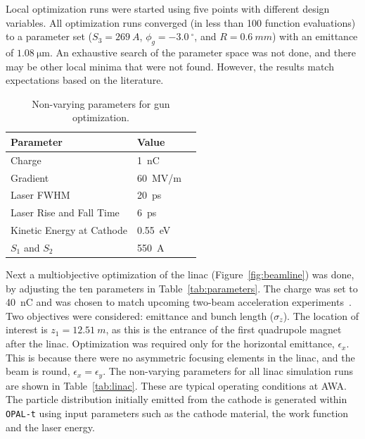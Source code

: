 Local optimization runs were started using five points 
with different design variables. All optimization runs converged 
(in less than 100 function evaluations) to a parameter set ($S_3=\SI{269}{A}$,
$\phi_g=\SI{-3.0}{^{\circ}}$, and $R=\SI{0.6}{mm}$) with an emittance of $\SI{1.08}{\um}$.
An exhaustive search of the parameter space was not done, and there may be other local minima that were not found.
However, the results match expectations based on the literature. 
\begin{table}%
	\caption{\label{tab:gun} Non-varying parameters for gun optimization.}
	\begin{center}
		\begin{tabular}{lll}
			\toprule
			\toprule
			\textbf{Parameter} & \textbf{Value} \\
			\midrule
			Charge  & \SI{1}{nC} \\
			Gradient & \SI{60}{MV/m} \\
			Laser FWHM & \SI{20}{ps} \\
			Laser Rise and Fall Time & \SI{6}{ps} \\
			Kinetic Energy at Cathode  & \SI{0.55}{eV} \\
			$S_1$ and $S_2$ & \SI{550}{A} \\
			\bottomrule
		\end{tabular}
	\end{center}
\end{table}

\label{sec:linacopt}
Next a multiobjective optimization of the linac (Figure~\ref{fig:beamline}) was done, 
by adjusting the ten parameters in Table~\ref{tab:parameters}. The charge was set to \SI{40}{nC}
and was chosen to match upcoming two-beam acceleration experiments~\cite{tba2017}. 
Two objectives were considered: emittance and bunch length ($\sigma_z$). 
The location of interest is $z_1=\SI{12.51}{m}$, as this is the entrance of the first 
quadrupole magnet after the linac. Optimization was required only for the horizontal emittance, $\epsilon_{x}$.  
This is because there were no asymmetric focusing elements in the linac, and the beam is round, $\epsilon_{x}=\epsilon_{y}$. 
The non-varying parameters for all linac simulation runs are shown in Table~\ref{tab:linac}. 
These are typical operating conditions at AWA. 
The particle distribution initially emitted from the cathode is generated within \verb|OPAL-t| 
using input parameters such as the cathode material, the work function and the laser energy.  

